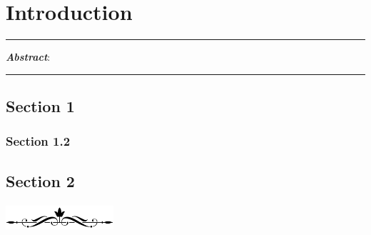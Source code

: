 
\chapter[Introduction]{Introduction} 
\label{ch_intro} 


\hrule height 1pt 
\vspace{7pt}
\begin{small}
    \begin{singlespace}
        \noindent
        \sffamily
        \textbf{\textit{Abstract}}: 
        \blindtext 
   \end{singlespace}
\end{small}
\vspace{5pt}
\hrule height 0.5pt 


\section{Section 1}
\label{sec_intro_affective_computing}
\blindtext 


\subsection{Section 1.2}
\blindtext 

\section{Section 2}
\Blindtext 
\begin{center}
    \includegraphics[width=4cm,height=1cm]{Figures/the_end.png}
\end{center}\vspace{5pt}

